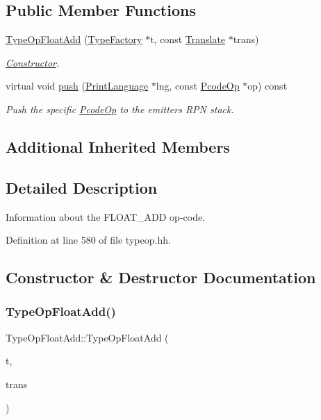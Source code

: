 \subsection*{Public Member Functions}
\begin{DoxyCompactItemize}
\item 
\mbox{\hyperlink{class_type_op_float_add_ab067526e97473f0596de636245aedb4d}{Type\+Op\+Float\+Add}} (\mbox{\hyperlink{class_type_factory}{Type\+Factory}} $\ast$t, const \mbox{\hyperlink{class_translate}{Translate}} $\ast$trans)
\begin{DoxyCompactList}\small\item\em \mbox{\hyperlink{class_constructor}{Constructor}}. \end{DoxyCompactList}\item 
virtual void \mbox{\hyperlink{class_type_op_float_add_a334917eafcc256e77a3ebd65875aa548}{push}} (\mbox{\hyperlink{class_print_language}{Print\+Language}} $\ast$lng, const \mbox{\hyperlink{class_pcode_op}{Pcode\+Op}} $\ast$op) const
\begin{DoxyCompactList}\small\item\em Push the specific \mbox{\hyperlink{class_pcode_op}{Pcode\+Op}} to the emitter\textquotesingle{}s R\+PN stack. \end{DoxyCompactList}\end{DoxyCompactItemize}
\subsection*{Additional Inherited Members}


\subsection{Detailed Description}
Information about the F\+L\+O\+A\+T\+\_\+\+A\+DD op-\/code. 

Definition at line 580 of file typeop.\+hh.



\subsection{Constructor \& Destructor Documentation}
\mbox{\label{class_type_op_float_add_ab067526e97473f0596de636245aedb4d}} 
\subsubsection{\texorpdfstring{TypeOpFloatAdd()}{TypeOpFloatAdd()}}
{\footnotesize\ttfamily Type\+Op\+Float\+Add\+::\+Type\+Op\+Float\+Add (\begin{DoxyParamCaption}\item[{\mbox{\hyperlink{class_type_factory}{Type\+Factory}} $\ast$}]{t,  }\item[{const \mbox{\hyperlink{class_translate}{Translate}} $\ast$}]{trans }\end{DoxyParamCaption})}



